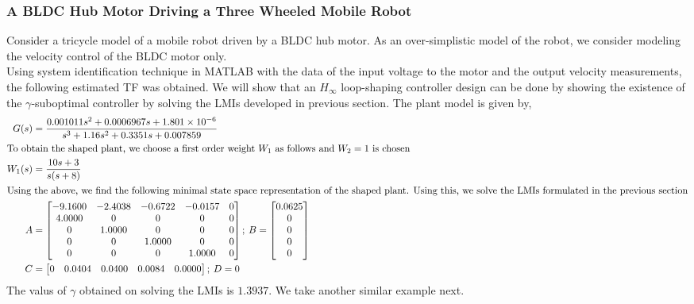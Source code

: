 \documentclass[a4paper,12pt]{article}
\begin{document}
	 		\subsubsection{A BLDC Hub Motor Driving a Three Wheeled Mobile Robot}
	 		Consider a tricycle model of a mobile robot driven by a BLDC hub motor. As an over-simplistic model of the robot, we consider modeling the velocity control of the BLDC motor only.\\
	 	Using system identification technique in MATLAB with the data of the input voltage to the motor and the output velocity measurements, the following estimated TF was obtained. We will show that an $H_{\infty}$ loop-shaping controller design can be done by showing the existence of the $\gamma$-suboptimal controller by solving the LMIs developed in previous section.
	 	The plant model is given by,
	 	\begin{align}
	 	G(s)&= \frac{0.001011s^{2} + 0.0006967{s} + 1.801 \times 10^{-6}}{s^{3} + 1.16 s^{2} + 0.3351s + 0.007859}\\
	 	\intertext{To obtain the shaped plant, we choose a first order weight $W_{1}$ as follows and $W_{2}=1$ is chosen}
	 	W_{1}(s) &= \frac{10s + 3}{s(s + 8)}\\
	 	\intertext{Using the above, we find the following  minimal state space representation of the shaped plant. Using this, we solve the LMIs formulated in the previous section}
	 	A& =\begin{bmatrix}
  -9.1600  & -2.4038 &  -0.6722  & -0.0157        & 0\\
    4.0000    &     0     &    0       &  0        & 0 \\
         0   & 1.0000    &     0       &  0        & 0 \\
        0    &     0   & 1.0000       &  0        & 0 \\
       0     &    0        & 0   & 1.0000        & 0 \\
\end{bmatrix} ; \:
B =
\begin{bmatrix}
    0.0625\\
         0\\
         0\\
         0\\
         0\\
\end{bmatrix}\\
C &= \begin{bmatrix}
         0    & 0.0404 &    0.0400 &   0.0084  &  0.0000
\end{bmatrix}; \:
D = 0
	 	\end{align}
	 The valus of $\gamma$ obtained on solving the LMIs is $1.3937$. We take another similar example next. 
\end{document}
